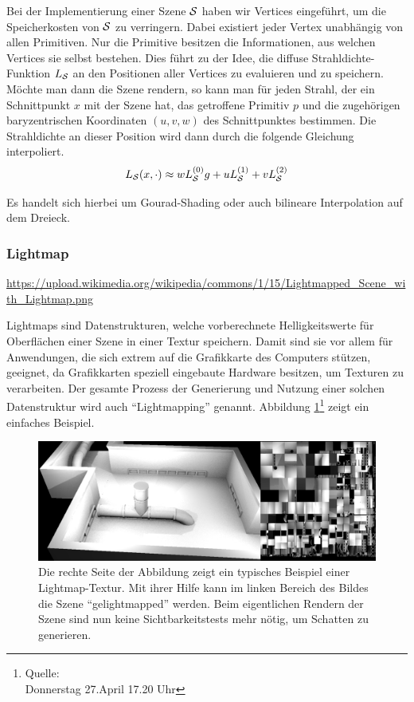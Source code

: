 			Bei der Implementierung einer Szene $\mathcal{S}$ haben wir Vertices eingeführt, um die Speicherkosten von $\mathcal{S}$ zu verringern.
			Dabei existiert jeder Vertex unabhängig von allen Primitiven.
			Nur die Primitive besitzen die Informationen, aus welchen Vertices sie selbst bestehen.
			Dies führt zu der Idee, die diffuse Strahldichte-Funktion $L_{\mathcal{S}}$ an den Positionen aller Vertices zu evaluieren und zu speichern.
			Möchte man dann die Szene rendern, so kann man für jeden Strahl, der ein Schnittpunkt $x$ mit der Szene hat, das getroffene Primitiv $p$ und die zugehörigen baryzentrischen Koordinaten $(u,v,w)$ des Schnittpunktes bestimmen.
			Die Strahldichte an dieser Position wird dann durch die folgende Gleichung interpoliert.
			\[
				L_{\mathcal{S}}(x,\cdot) \approx w L^{(0)}_{\mathcal{S}}g + u L^{(1)}_{\mathcal{S}} + v L^{(2)}_{\mathcal{S}}
			\]

			Es handelt sich hierbei um Gourad-Shading oder auch bilineare Interpolation auf dem Dreieck.


		\subsubsection{Lightmap} %
		\label{ssub:lightmap}

			\urldef{\urllightmapexample}\url{https://upload.wikimedia.org/wikipedia/commons/1/15/Lightmapped_Scene_with_Lightmap.png}

			Lightmaps sind Datenstrukturen, welche vorberechnete Helligkeitswerte für Oberflächen einer Szene in einer Textur speichern.
			Damit sind sie vor allem für Anwendungen, die sich extrem auf die Grafikkarte des Computers stützen, geeignet, da Grafikkarten speziell eingebaute Hardware besitzen, um Texturen zu verarbeiten.
			Der gesamte Prozess der Generierung und Nutzung einer solchen Datenstruktur wird auch \enquote{Lightmapping} genannt.
			Abbildung \ref{fig:lightmap-example}\footnote{Quelle: \urllightmapexample \\ Donnerstag 27.April 17.20 Uhr} zeigt ein einfaches Beispiel.

			\begin{figure}[h]
				\center
				\includegraphics[scale=0.2]{pic/lightmap_example.png}
				\caption{Die rechte Seite der Abbildung zeigt ein typisches Beispiel einer Lightmap-Textur. Mit ihrer Hilfe kann im linken Bereich des Bildes die Szene \enquote{gelightmapped} werden. Beim eigentlichen Rendern der Szene sind nun keine Sichtbarkeitstests mehr nötig, um Schatten zu generieren.}
				\label{fig:lightmap-example}
			\end{figure}

